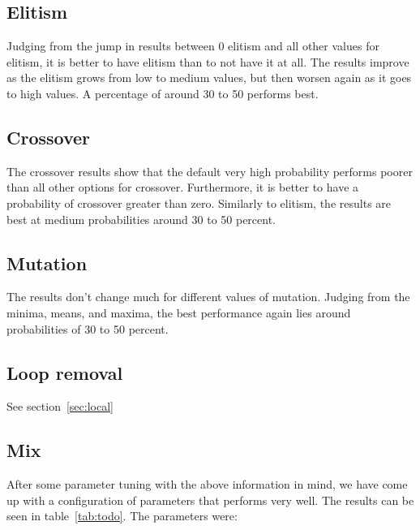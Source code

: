 \documentclass{report}
\begin{document}
\subsection{Elitism}
Judging from the jump in results between 0 elitism and all other values for elitism, it is better to have elitism than to not have it at all. The results improve as the elitism grows from low to medium values, but then worsen again as it goes to high values. A percentage of around 30 to 50 performs best. 

\subsection{Crossover}
The crossover results show that the default very high probability performs poorer than all other options for crossover. Furthermore, it is better to have a probability of crossover greater than zero. Similarly to elitism, the results are best at medium probabilities around 30 to 50 percent. 

\subsection{Mutation}
The results don't change much for different values of mutation. Judging from the minima, means, and maxima, the best performance again lies around probabilities of 30 to 50 percent.

\subsection{Loop removal}
See section~\ref{sec:local}

\subsection{Mix}
After some parameter tuning with the above information in mind, we have come up with a configuration of parameters that performs very well. The results can be seen in table~\ref{tab:todo}. The parameters were:
\end{document}
